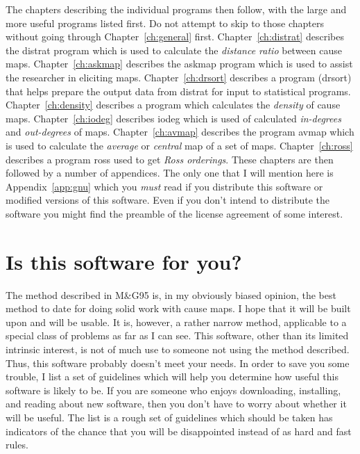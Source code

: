 \documentclass[%
	11pt,
        a4paper,
        twoside]{workrep}
\newcommand*{\prg}[1]{\textsf{#1}}		%
\newcommand*{\nt}[1]{\textit{#1}}		%
\newcommand{\MG}{M\&G95\xspace}			%
\begin{document}
The chapters describing the individual programs then follow, with
the large and more useful programs listed first.  Do not
attempt to skip to those chapters without going through
Chapter~\ref{ch:general} first.  Chapter~\ref{ch:distrat}
describes the \prg{distrat} program which is used to calculate
the \nt{distance ratio} between cause maps.  Chapter~\ref{ch:askmap}
describes the \prg{askmap} program which is used to assist the
researcher in eliciting maps.  Chapter~\ref{ch:drsort} describes
a program (\prg{drsort}) that helps prepare the output data from
\prg{distrat} for input to statistical programs.  Chapter~\ref{ch:density}
describes a program which calculates the \nt{density} of cause maps.
Chapter~\ref{ch:iodeg} describes \prg{iodeg} which is used of
calculated \nt{in-degrees} and \nt{out-degrees} of maps.
Chapter~\ref{ch:avmap} describes the program \prg{avmap} which is
used to calculate the \nt{average} or \nt{central} map of a set of
maps.  Chapter~\ref{ch:ross} describes a program \prg{ross} used to
get \nt{Ross orderings}.  These chapters are then followed by
a number of appendices.  The only one that I will mention here
is Appendix~\ref{app:gnu} which you \emph{must} read if you distribute
this software or modified versions of this software.  Even if you
don't intend to distribute the software you might find the preamble
of the license agreement of some interest.

\section{Is this software for you?}\label{sec:foryou}

The method described in \MG is, in my obviously biased opinion,
the best method to date for doing solid work with cause maps.  I hope
that it will be built upon and will be usable.  It is, however,
a rather narrow method, applicable to a special class of problems as
far as I can see.  This software, other than its limited intrinsic interest,
is not of much use to someone not using the method described.  Thus,
this software probably doesn't meet your needs.  In order to save
you some trouble, I list a set of guidelines which will help
you determine how useful this software is likely to be.  If
you are someone who enjoys downloading, installing, and reading
about new software, then you don't have to worry about whether it
will be useful.  The list is a rough set of guidelines which should
be taken has indicators of the chance that you will be disappointed
instead of as hard and fast rules.
\end{document}
